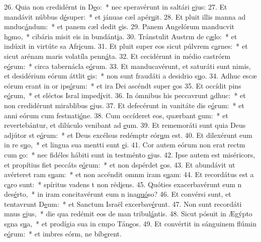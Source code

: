 26. Quia non credidérnt in D\uline{e}o:~* nec speravérunt in saltári \uline{e}jus:
27. Et mandávit núbbus d\uline{é}super:~* et jánuas cæl apér\uline{u}it.
28. Et pluit illis manna ad mnduc\uline{á}ndum:~* et panem cæl dedit \uline{e}is.
29. Panem Angelórum manducvit h\uline{o}mo,~* cibária misit eis in bundánt\uline{i}a.
30. Tránstulit Austrm de c\uline{æ}lo:~* et indúxit in virtúte sa Afr\uline{i}cum.
31. Et pluit super eos sicut púlvrem c\uline{a}rnes:~* et sicut arénam maris volatíla penn\uline{á}ta.
32. Et cecidérunt in médio castrórm e\uline{ó}rum:~* circa tabernácla e\uline{ó}rum.
33. Et manducavérunt, et saturáti sunt nimis, et desidérium eórum áttlit \uline{e}is:~* non sunt fraudáti a desidrio s\uline{u}o.
34. Adhuc escæ eórum erant in or ips\uline{ó}rum:~* et ira Dei ascéndt super \uline{e}os
35. Et occídit pins e\uline{ó}rum,~* et eléctos Isral imped\uline{í}vit.
36. In ómnibus his peccavrunt \uline{a}dhuc:~* et non credidérunt mirablibus \uline{e}jus.
37. Et defecérunt in vanitáte dis e\uline{ó}rum:~* et anni eórum cum festnati\uline{ó}ne.
38. Cum occíderet eos, quærbant \uline{e}um:~* et revertebántur, et dilúculo venibant ad \uline{e}um.
39. Et rememoráti sunt quia Deus adjútor st e\uline{ó}rum:~* et Deus excélsus redémptr eór\uline{u}m est.
40. Et dilexérunt eum in re s\uline{u}o,~* et lingua sua mentti sunt \uline{e}i.
41. Cor autem eórum non erat rectm cum \uline{e}o:~* nec fidéles hábiti sunt in testménto \uline{e}jus.
42. Ipse autem est miséricors, et propítius fiet peccáts e\uline{ó}rum:~* et non dspérdet \uline{e}os.
43. Et abundávit ut avérteret ram s\uline{u}am:~* et non accéndit omnm iram s\uline{u}am:
44. Et recordátus est a c\uline{a}ro sunt:~* spíritus vadens t non réd\uline{i}ens.
45. Quóties exacerbavérunt eum n des\uline{é}rto,~* in iram concitavérunt eum n ina\uline{quó}so?
46. Et convérsi sunt, et tentavrunt D\uline{e}um:~* et Sanctum Israël excerbav\uline{é}runt.
47. Non sunt recordáti mnus \uline{e}jus,~* die qua redémit eos de man tribul\uline{á}ntis.
48. Sicut pósuit in Ægýpto sgna s\uline{u}a,~* et prodígia sua in cmpo Tán\uline{e}os.
49. Et convértit in sánguinem flúmin e\uline{ó}rum:~* et imbres eórm, ne bíb\uline{e}rent.
